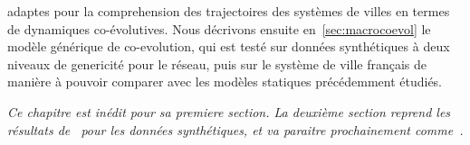 adaptes pour la comprehension des trajectoires des systèmes de villes en termes de dynamiques co-évolutives. Nous décrivons ensuite en~\ref{sec:macrocoevol} le modèle générique de co-evolution, qui est testé sur données synthétiques à deux niveaux de genericité pour le réseau, puis sur le système de ville français de manière à pouvoir comparer avec les modèles statiques précédemment étudiés.




\stars


\textit{Ce chapitre est inédit pour sa premiere section. La deuxième section reprend les résultats de~\cite{} %
pour les données synthétiques, et va paraitre prochainement comme~\cite{}. %
}















